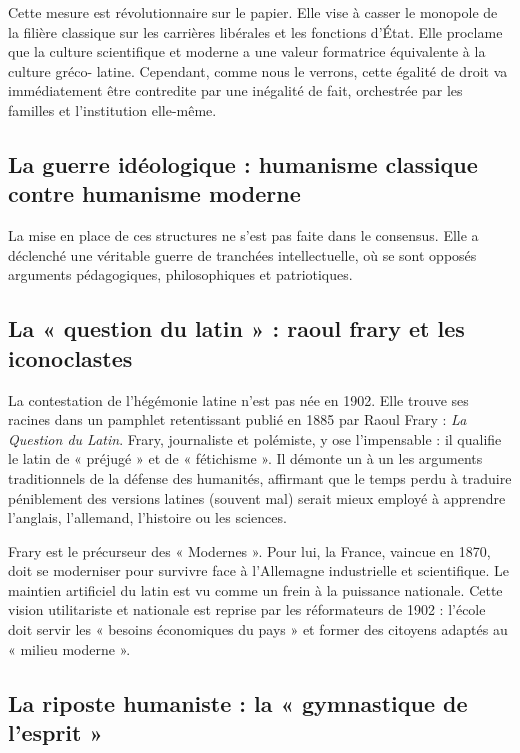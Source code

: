 Cette mesure est révolutionnaire sur le papier. Elle vise à casser le monopole de la filière
classique sur les carrières libérales et les fonctions d'État. Elle proclame que la culture
scientifique et moderne a une valeur formatrice équivalente à la culture gréco-
latine.\cite{I-2-1-ref4} Cependant, comme nous le verrons, cette égalité de droit va immédiatement
être contredite par une inégalité de fait, orchestrée par les familles et l'institution elle-même.



\subsection{La guerre idéologique : humanisme classique contre humanisme moderne}

La mise en place de ces structures ne s'est pas faite dans le consensus. Elle a déclenché une
véritable guerre de tranchées intellectuelle, où se sont opposés arguments pédagogiques,
philosophiques et patriotiques.



\subsection{La « question du latin » : raoul frary et les iconoclastes}

La contestation de l'hégémonie latine n'est pas née en 1902. Elle trouve ses racines dans un
pamphlet retentissant publié en 1885 par Raoul Frary : \textit{La Question du
Latin}.\cite{I-2-1-ref9} Frary, journaliste et polémiste, y ose l'impensable : il qualifie le latin
de « préjugé » et de « fétichisme ». Il démonte un à un les arguments traditionnels de la défense
des humanités, affirmant que le temps perdu à traduire péniblement des versions latines (souvent
mal) serait mieux employé à apprendre l'anglais, l'allemand, l'histoire ou les sciences.

Frary est le précurseur des « Modernes ». Pour lui, la France, vaincue en 1870, doit se moderniser
pour survivre face à l'Allemagne industrielle et scientifique. Le maintien artificiel du latin est
vu comme un frein à la puissance nationale. Cette vision utilitariste et nationale est reprise par
les réformateurs de 1902 : l'école doit servir les « besoins économiques du pays » et former des
citoyens adaptés au « milieu moderne ».\cite{I-2-1-ref4}



\subsection{La riposte humaniste : la « gymnastique de l'esprit »}

